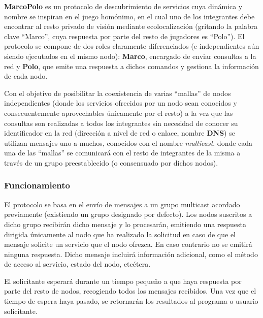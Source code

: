 \textbf{MarcoPolo} es un protocolo de descubrimiento de servicios cuya dinámica y nombre se inspiran en el juego homónimo, en el cual uno de los integrantes debe encontrar al resto privado de visión mediante ecolocalización (gritando la palabra clave ``Marco'', cuya respuesta por parte del resto de jugadores es ``Polo''). El protocolo se compone de dos roles claramente diferenciados (e independientes aún siendo ejecutados en el mismo nodo): \textbf{Marco}, encargado de enviar consultas a la red y \textbf{Polo}, que emite una respuesta a dichos comandos y gestiona la información de cada nodo. %

Con el objetivo de posibilitar la coexistencia de varias ``mallas'' de nodos independientes (donde los servicios ofrecidos por un nodo sean conocidos y consecuentemente aprovechables únicamente por el resto) a la vez que las consultas son realizadas a todos los integrantes sin necesidad de conocer su identificador en la red (dirección a nivel de red o enlace, nombre \textbf{DNS}) se utilizan mensajes uno-a-muchos, conocidos con el nombre \textit{multicast}, donde cada una de las ``mallas'' se comunicará con el resto de integrantes de la misma a través de un grupo preestablecido (o consensuado por dichos nodos).

\subsubsection{Funcionamiento}

El protocolo se basa en el envío de mensajes a un grupo multicast acordado previamente (existiendo un grupo designado por defecto). Los nodos suscritos a dicho grupo recibirán dicho mensaje y lo procesarán, emitiendo una respuesta dirigida únicamente al nodo que ha realizado la solicitud en caso de que el mensaje solicite un servicio que el nodo ofrezca. En caso contrario no se emitirá ninguna respuesta. Dicho mensaje incluirá información adicional, como el método de acceso al servicio, estado del nodo, etcétera.

El solicitante esperará durante un tiempo pequeño a que haya respuesta por parte del resto de nodos, recogiendo todos los mensajes recibidos. Una vez que el tiempo de espera haya pasado, se retornarán los resultados al programa o usuario solicitante.

